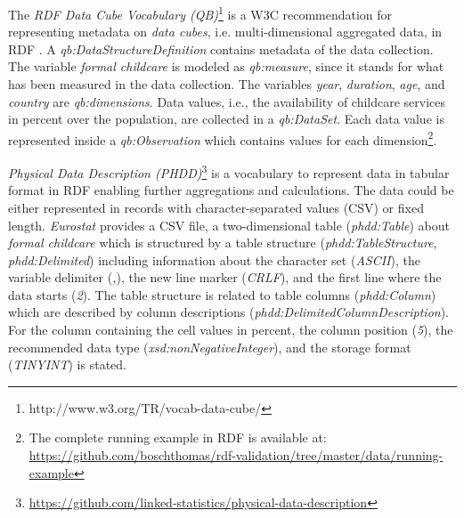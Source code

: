 \documentclass{llncs}
\newcommand{\ke}[1]{\todo[size=\small, color=red!40]{\textbf{Kai:} #1}}
\newcommand{\tb}[1]{\todo[size=\small, color=green!40]{\textbf{Thomas:} #1}}
\begin{document}
The \emph{RDF Data Cube Vocabulary (QB)}\footnote{http://www.w3.org/TR/vocab-data-cube/} is a W3C recommendation for representing metadata on \emph{data cubes}, i.e. multi-dimensional aggregated data, in RDF \cite{Cyganiak2010}. 
A \emph{qb:DataStructureDefinition} contains metadata of the data collection.
The variable \emph{formal childcare} is modeled as \emph{qb:measure}, since it stands for what has been measured in the data collection.
The variables \emph{year}, \emph{duration}, \emph{age}, and \emph{country} are \emph{qb:dimensions}.
Data values, i.e., the availability of childcare services in percent over the population, are collected in a \emph{qb:DataSet}. 
Each data value is represented inside a \emph{qb:Observation} which contains values for each dimension\footnote{The complete running example in RDF is available at: \url{https://github.com/boschthomas/rdf-validation/tree/master/data/running-example}}. 

\emph{Physical Data Description (PHDD)}\footnote{\url{https://github.com/linked-statistics/physical-data-description}} is a vocabulary to represent data in tabular format in RDF enabling further aggregations and calculations. 
The data could be either represented in records with character-separated values (CSV) or fixed length. 
\emph{Eurostat} provides a CSV file, a two-dimensional table (\emph{phdd:Table}) about \emph{formal childcare} 
which is structured by a table structure (\emph{phdd:TableStructure}, \emph{phdd:Delimited})
including information about the character set (\emph{ASCII}), the variable delimiter (\emph{,}), the new line marker (\emph{CRLF}), and the first line where the data starts (\emph{2}).
The table structure is related to table columns (\emph{phdd:Column}) which are described by column descriptions (\emph{phdd:DelimitedColumnDescription}).
For the column containing the cell values in percent, the column position (\emph{5}), the recommended data type (\emph{xsd:nonNegativeInteger}), and the storage format (\emph{TINYINT}) is stated. 
\end{document}
